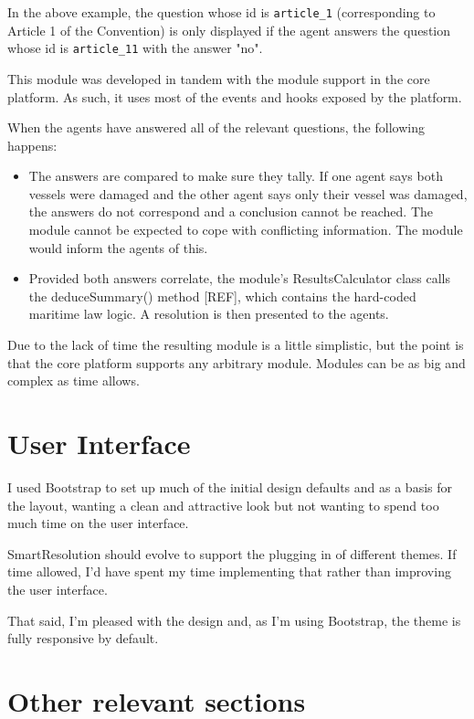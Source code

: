 In the above example, the question whose id is \lstinline{article_1} (corresponding to Article 1 of the Convention) is only displayed if the agent answers the question whose id is \lstinline{article_11} with the answer "no".

This module was developed in tandem with the module support in the core platform. As such, it uses most of the events and hooks exposed by the platform.

When the agents have answered all of the relevant questions, the following happens:

\begin{itemize}
    \item The answers are compared to make sure they tally. If one agent says both vessels were damaged and the other agent says only their vessel was damaged, the answers do not correspond and a conclusion cannot be reached. The module cannot be expected to cope with conflicting information. The module would inform the agents of this.
    \item Provided both answers correlate, the module's ResultsCalculator class calls the deduceSummary() method [REF], which contains the hard-coded maritime law logic. A resolution is then presented to the agents.
\end{itemize}

Due to the lack of time the resulting module is a little simplistic, but the point is that the core platform supports any arbitrary module. Modules can be as big and complex as time allows.

\section{User Interface}

I used Bootstrap to set up much of the initial design defaults and as a basis for the layout, wanting a clean and attractive look but not wanting to spend too much time on the user interface. 

SmartResolution should evolve to support the plugging in of different themes. If time allowed, I'd have spent my time implementing that rather than improving the user interface.

That said, I'm pleased with the design and, as I'm using Bootstrap, the theme is fully responsive by default.

\section{Other relevant sections}